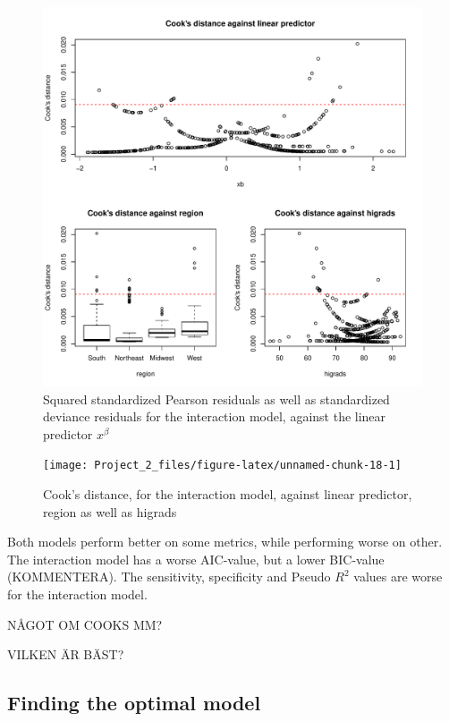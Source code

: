 \documentclass[a4paper]{article}
\begin{document}
\begin{figure}[h]
\includegraphics{Project_2_files/figure-latex/unnamed-chunk-17-1} \caption{\label{fig:residuals_interaction}Squared standardized Pearson residuals as well as standardized deviance residuals for the interaction model, against the linear predictor $x^{\beta}$}\label{fig:unnamed-chunk-17}
\end{figure}

\begin{figure}[h]
\texttt{[image: Project\_2\_files/figure-latex/unnamed-chunk-18-1]} \caption{\label{fig:cooks_interaction}Cook's distance, for the interaction model, against linear predictor, region as well as higrads}\label{fig:unnamed-chunk-18}
\end{figure}

Both models perform better on some metrics, while performing worse on
other. The interaction model has a worse AIC-value, but a lower
BIC-value (KOMMENTERA). The sensitivity, specificity and Pseudo \(R^2\)
values are worse for the interaction model.

NÅGOT OM COOKS MM?

VILKEN ÄR BÄST?

\hypertarget{finding-the-optimal-model}{%
\subsection{Finding the optimal model}\label{finding-the-optimal-model}}
\end{document}
